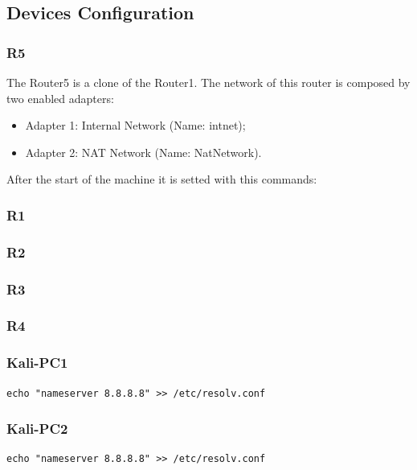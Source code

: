 \subsection{Devices Configuration}

\subsubsection*{R5}
The Router5 is a clone of the Router1.
The network of this router is composed by two enabled adapters:
\begin{itemize}
	\item Adapter 1: Internal Network (Name: intnet);
	\item Adapter 2: NAT Network (Name: NatNetwork).
\end{itemize}
After the start of the machine it is setted with this commands:



\subsubsection*{R1}


\subsubsection*{R2}


\subsubsection*{R3}


\subsubsection*{R4}


\subsubsection*{Kali-PC1}

\begin{lstlisting}
echo "nameserver 8.8.8.8" >> /etc/resolv.conf
\end{lstlisting}

\subsubsection*{Kali-PC2}

\begin{lstlisting}
echo "nameserver 8.8.8.8" >> /etc/resolv.conf
\end{lstlisting}

